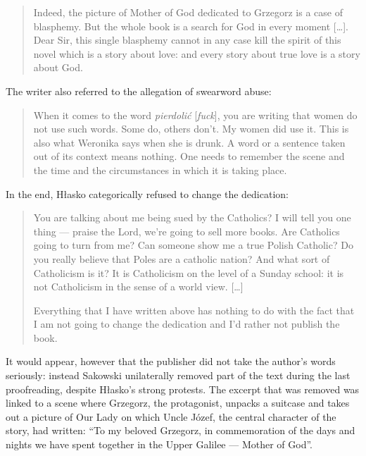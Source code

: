 \begin{paper}
\begin{quote}
Indeed, the picture of Mother of God dedicated to Grzegorz is a case of
blasphemy. But the whole book is a search for God in every moment
{[}\ldots{}{]}. Dear Sir, this single blasphemy cannot in any case kill
the spirit of this novel which is a story about love: and every story
about true love is a story about God.
\begin{flushright}
\citep[111]{kielanowski_kulisy_1967}
\end{flushright}
\end{quote}

\noindent The writer also referred to the allegation of swearword abuse: 

\begin{quote}
When it
comes to the word \emph{pierdolić} {[}\emph{fuck}{]}, you
are writing that women do not use such words. Some do, others don't. My
women did use it. This is also what Weronika says when she is drunk. A
word or a sentence taken out of its context means nothing. One needs to
remember the scene and the time and the circumstances in which it is
taking place.
\begin{flushright}
\citep[112]{kielanowski_kulisy_1967}
\end{flushright}
\end{quote}

\noindent In the end, Hłasko categorically refused to change the dedication:

\begin{quote}
You are talking about me being sued by the Catholics? I will tell you
one thing --- praise the Lord, we're going to sell more books. Are
Catholics going to turn from me? Can someone show me a true Polish
Catholic? Do you really believe that Poles are a catholic nation? And
what sort of Catholicism is it? It is Catholicism on the level of a
Sunday school: it is not Catholicism in the sense of a world view.
{[}\ldots{}{]}

Everything that I have written above has nothing to do with the fact
that I am not going to change the dedication and I'd rather not publish
the book.
\begin{flushright}
\citep[113]{kielanowski_kulisy_1967}
\end{flushright}
\end{quote}

\noindent It would appear, however that the publisher did not take the
author's words seriously: instead Sakowski unilaterally removed part of the text during the last proofreading, despite Hłasko's
strong protests. The excerpt that was removed was linked to a scene where
Grzegorz, the protagonist, unpacks a suitcase and takes out a picture of
Our Lady on which Uncle Józef, the central character of the story, had
written: ``To my beloved Grzegorz, in commemoration of the days and
nights we have spent together in the Upper Galilee --- Mother of God''.


\end{paper}
